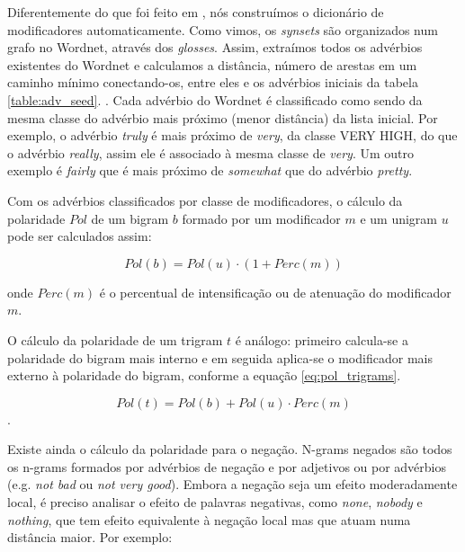Diferentemente do que foi feito em , nós construímos o dicionário de modificadores automaticamente. Como vimos, os \textit{synsets} são organizados num grafo no Wordnet, através dos \textit{glosses}. Assim, extraímos todos os advérbios existentes do Wordnet e calculamos a distância, número de arestas em um caminho mínimo conectando-os, entre eles e os advérbios iniciais da tabela \ref{table:adv_seed}. . Cada advérbio do Wordnet é classificado como sendo da mesma classe do advérbio mais próximo (menor distância) da lista inicial. Por exemplo, o advérbio \textit{truly} é mais próximo de \textit{very}, da classe VERY HIGH, do que o advérbio \textit{really}, assim ele é associado à mesma classe de \textit{very}. Um outro exemplo é \textit{fairly} que é mais próximo de \textit{somewhat} que do advérbio \textit{pretty}. 

Com os advérbios classificados por classe de modificadores, o cálculo da polaridade $Pol$ de um bigram $b$ formado por um modificador $m$ e um unigram $u$ pode ser calculados assim: 

\begin{equation}
Pol(b) = Pol(u) \cdot (1 + Perc(m))
\label{eq:pol_bigrams}
\end{equation}

onde $Perc(m)$ é o percentual de intensificação ou de atenuação do modificador $m$. 

O cálculo da polaridade de um trigram $t$ é análogo: primeiro calcula-se a polaridade do bigram mais interno e em seguida aplica-se o modificador mais externo à polaridade do bigram, conforme a equação \ref{eq:pol_trigrams}.

\begin{equation} 
Pol(t) = Pol(b) + Pol(u) \cdot Perc(m)
\label{eq:pol_trigrams}
\end{equation}.

Existe ainda o cálculo da polaridade para o negação. N-grams negados são todos os n-grams formados por advérbios de negação e por adjetivos ou por advérbios (e.g. \textit{not bad} ou \textit{not very good}). Embora a negação seja um efeito moderadamente local, é preciso analisar o efeito de palavras negativas, como \textit{none}, \textit{nobody} e \textit{nothing}, que tem efeito equivalente à negação local \cite{taboada2011lexicon} mas que atuam numa distância maior. Por exemplo:

